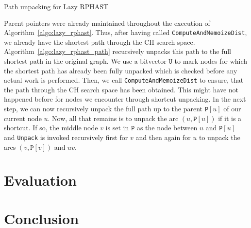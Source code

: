 \documentclass[a4paper,UKenglish,cleveref, autoref, thm-restate]{lipics-v2021}
\begin{document}
\begin{algorithm2e}

\caption{Path unpacking for Lazy RPHAST}
\label{algo:lazy_rphast_path}
\end{algorithm2e}

Parent pointers were already maintained throughout the execution of Algorithm~\ref{algo:lazy_rphast}.
Thus, after having called \texttt{ComputeAndMemoizeDist}, we already have the shortest path through the CH search space.
Algorithm~\ref{algo:lazy_rphast_path} recursively unpacks this path to the full shortest path in the original graph.
We use a bitvector $\mathtt{U}$ to mark nodes for which the shortest path has already been fully unpacked which is checked before any actual work is performed.
Then, we call \texttt{ComputeAndMemoizeDist} to ensure, that the path through the CH search space has been obtained.
This might have not happened before for nodes we encounter through shortcut unpacking.
In the next step, we can now recursively unpack the full path up to the parent $\mathtt{P}[u]$ of our current node $u$.
Now, all that remains is to unpack the arc $(u, \mathtt{P}[u])$ if it is a shortcut.
If so, the middle node $v$ is set in $\mathtt{P}$ as the node between $u$ and $\mathtt{P}[u]$ and \texttt{Unpack} is invoked recursively first for $v$ and then again for $u$ to unpack the arcs $(v, \mathtt{P}[v])$ and $uv$.

\section{Evaluation}

\section{Conclusion}
\end{document}
